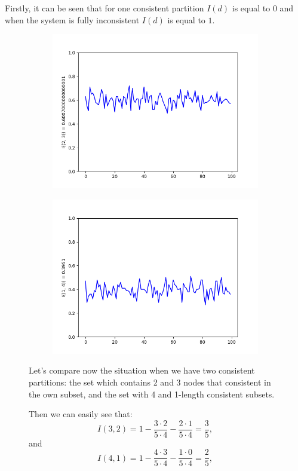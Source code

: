 \documentclass{llncs}
\begin{document}
Firstly, it can be seen that for one consistent partition $I(d)$ is equal to $0$ and when the system is fully inconsistent $I(d)$ is equal to $1$.
\begin{figure}

\begin{subfigure}{0.5\linewidth}
\centering\includegraphics[scale=0.4]{images/2-3-consistent-partitions-probability.png}\hfill
\end{subfigure}
\begin{subfigure}{0.5\linewidth}
\centering\includegraphics[scale=0.4]{images/1-4-consistent-partitions-probability.png}
\end{subfigure}

Let's compare now the situation when we have two consistent partitions: the set which contains 2 and 3 nodes that consistent in the own subset, and the set with 4 and 1-length consistent subsets.

Then we can easily see that:
\[I(3,2) = 1 - \frac{3 \cdot 2}{5 \cdot 4} - \frac{2 \cdot 1}{5 \cdot 4} = \frac{3}{5} ,\]
and
\[I(4,1) = 1 - \frac{4 \cdot 3}{5 \cdot 4} - \frac{1 \cdot 0}{5 \cdot 4} = \frac{2}{5} ,\]
\end{figure}
\end{document}
